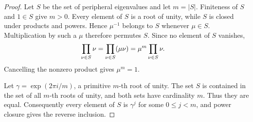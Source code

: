 \begin{proof}
    \leanok
    Let $S$ be the set of peripheral eigenvalues and let $m=|S|$.
    Finiteness of $S$ and $1\in S$ give $m>0$. Every element of $S$ is a root
    of unity, while $S$ is closed under products and powers. Hence $\mu^{-1}$
    belongs to $S$ whenever $\mu\in S$. Multiplication by such a $\mu$
    therefore permutes $S$. Since no element of $S$ vanishes,
    \begin{align}
        \prod_{\nu\in S}\nu
         & =\prod_{\nu\in S}(\mu\nu)
          =\mu^m\prod_{\nu\in S}\nu.
        \notag
    \end{align}
    Cancelling the nonzero product gives $\mu^m=1$.

    Let $\gamma=\exp(2\pi i/m)$, a primitive $m$-th root of unity. The set
    $S$ is contained in the set of all $m$-th roots of unity, and both sets
    have cardinality $m$. Thus they are equal. Consequently every element of
    $S$ is $\gamma^j$ for some $0\leq j<m$, and power closure gives the reverse
    inclusion.
\end{proof}

